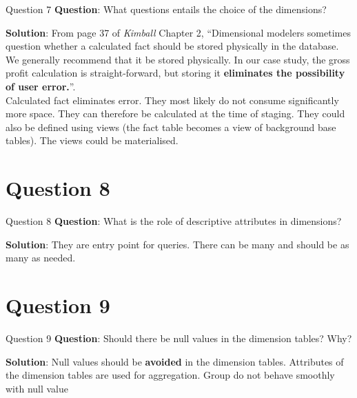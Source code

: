 \begin{frame}[fragile]{Question 7}
	\textbf{Question}: What questions entails the choice of the dimensions?\\\vspace{10pt}
	
	\textbf{Solution}: From page 37 of \textit{Kimball} Chapter 2, ``Dimensional modelers sometimes question whether a calculated fact should be stored physically in the database. We generally recommend that it be stored
	physically. In our case study, the gross profit calculation is straight-forward, but storing it \textbf{eliminates	the possibility of user error.}''. \\\vspace{5pt}
	Calculated fact eliminates error. They most likely do not consume
	significantly more space. They can therefore be calculated at the time of staging. They could also be defined using views (the fact table becomes a view of background base tables). The views could be materialised.
\end{frame}

\section*{Question 8}

\begin{frame}[fragile]{Question 8}
	\textbf{Question}: What is the role of descriptive attributes in dimensions?\\\vspace{10pt}
	
	\textbf{Solution}: They are entry point for queries. There can be many and should be as many as needed.
\end{frame}

\section*{Question 9}

\begin{frame}[fragile]{Question 9}
	\textbf{Question}: Should there be null values in the dimension tables? Why? \\\vspace{10pt}
	
	\textbf{Solution}: Null values should be \textbf{avoided} in the dimension tables. Attributes of the dimension tables are used for aggregation. Group do not behave smoothly with null value
\end{frame}

